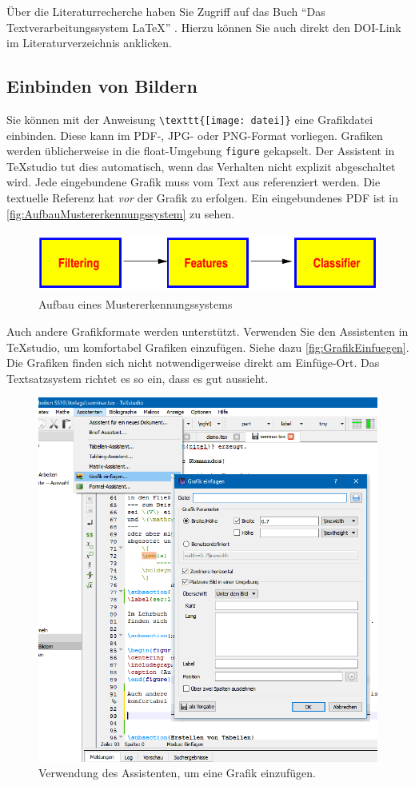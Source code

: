 Über die Literaturrecherche haben Sie Zugriff auf das Buch "`Das Textverarbeitungssystem LaTeX"' \cite{Oechsner2015}. Hierzu können Sie auch direkt den DOI-Link im Literaturverzeichnis anklicken.

\subsection{Einbinden von Bildern}

Sie können mit der Anweisung \verb|\texttt{[image: datei]}| eine Grafikdatei einbinden. Diese kann im PDF-, JPG- oder PNG-Format vorliegen. Grafiken werden üblicherweise in die float-Umgebung \verb|figure| gekapselt. Der Assistent in TeXstudio \cite{vanderZander2018} tut dies automatisch, wenn das Verhalten nicht explizit abgeschaltet wird. Jede eingebundene Grafik muss vom Text aus referenziert werden. Die textuelle Referenz hat \textit{vor} der Grafik zu erfolgen. Ein eingebundenes PDF ist in \autoref{fig:AufbauMustererkennungssystem} zu sehen.

\begin{figure}[tb]
\centering
\includegraphics [height=20mm] {images/bildchen}
\caption {Aufbau eines Mustererkennungssystems}
\label{fig:AufbauMustererkennungssystem}
\end{figure}

Auch andere Grafikformate werden unterstützt. Verwenden Sie den Assistenten in TeXstudio, um komfortabel Grafiken einzufügen. Siehe dazu \autoref{fig:GrafikEinfuegen}. Die Grafiken finden sich nicht notwendigerweise direkt am Einfüge-Ort. Das Textsatzsystem richtet es so ein, dass es gut aussieht.

\begin{figure}
\centering
\includegraphics[width=0.7\linewidth]{images/GrafikEinfuegen}
\caption{Verwendung des Assistenten, um eine Grafik einzufügen.}
\label{fig:GrafikEinfuegen}
\end{figure}

